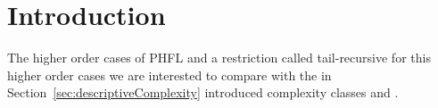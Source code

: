 \chapter{Introduction}\label{ch:introduction}

The higher order cases of PHFL and a restriction called
tail-recursive for this higher order cases we are interested to compare with the in
Section~\ref{sec:descriptiveComplexity} introduced complexity classes  and .